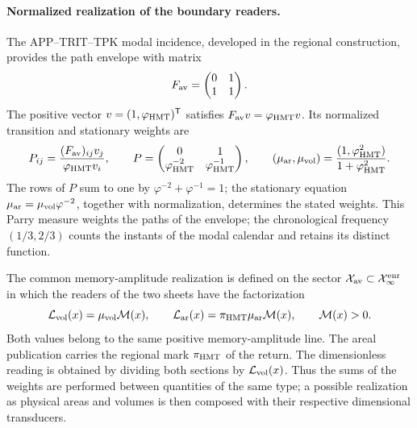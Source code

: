\paragraph{Normalized realization of the boundary readers.}
The APP--TRIT--TPK modal incidence, developed in the regional
construction, provides the path envelope with matrix
\[
 F_{\rm av}=\begin{pmatrix}0&1\\1&1\end{pmatrix}.
\]
The positive vector \(v=(1,\varphi_{\rm HMT})^{\mathsf T}\)
satisfies \(F_{\rm av}v=\varphi_{\rm HMT}v\). Its normalized
transition and stationary weights are
\begin{equation}
 P_{ij}=\frac{(F_{\rm av})_{ij}v_j}{\varphi_{\rm HMT}v_i},
 \qquad
 P=\begin{pmatrix}0&1\\
 \varphi_{\rm HMT}^{-2}&\varphi_{\rm HMT}^{-1}\end{pmatrix},
 \qquad
 (\mu_{\rm ar},\mu_{\rm vol})
 =\frac{(1,\varphi_{\rm HMT}^{2})}{1+\varphi_{\rm HMT}^{2}}.
 \label{vii:vii:eq:lectores-parry}
\end{equation}
The rows of \(P\) sum to one by
\(\varphi^{-2}+\varphi^{-1}=1\); the stationary equation
\(\mu_{\rm ar}=\mu_{\rm vol}\varphi^{-2}\), together with
normalization, determines the stated weights. This Parry measure
weights the paths of the envelope; the chronological frequency
\((1/3,2/3)\) counts the instants of the modal calendar and retains
its distinct function.

The common memory-amplitude realization is defined on the sector
\(\mathcal X_{\rm av}\subset\mathcal X_\infty^{\rm enr}\) in which
the readers of the two sheets have the factorization
\begin{equation}
 \mathcal L_{\rm vol}(x)=\mu_{\rm vol}\mathcal M(x),\qquad
 \mathcal L_{\rm ar}(x)=\pi_{\rm HMT}\mu_{\rm ar}\mathcal M(x),
 \qquad \mathcal M(x)>0.
 \label{vii:vii:eq:lectores-amplitud-comun}
\end{equation}
Both values belong to the same positive memory-amplitude
line. The areal publication carries the regional mark
\(\pi_{\rm HMT}\) of the return. The dimensionless reading is obtained
by dividing both sections by \(\mathcal L_{\rm vol}(x)\).
Thus the sums of the weights are performed between quantities of the
same type; a possible realization as physical areas and volumes
is then composed with their respective dimensional transducers.

